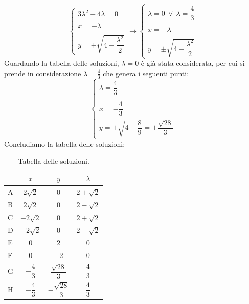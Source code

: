 \documentclass[a4paper]{article}
\begin{document}
	\begin{equation*}
		\begin{cases}
			3\lambda^{2} - 4\lambda = 0 \\
			\\
			x = -\lambda \\
			\\
			y = \pm \sqrt{4 - \dfrac{\lambda^{2}}{2}}
		\end{cases}
		\longrightarrow
		\begin{cases}
			\lambda = 0 \: \lor \: \lambda = \dfrac{4}{3}  \\
			\\
			x = -\lambda \\
			\\
			y = \pm \sqrt{4 - \dfrac{\lambda^{2}}{2}}
		\end{cases}
	\end{equation*}
	Guardando la tabella delle soluzioni, $\lambda = 0$ è già stata considerata, per cui si prende in considerazione $\lambda = \frac{4}{3}$ che genera i seguenti punti:
	\begin{equation*}
		\begin{cases}
			\lambda = \dfrac{4}{3} \\
			\\
			x = -\dfrac{4}{3} \\
			y = \pm \sqrt{4 - \dfrac{8}{9}} = \pm \dfrac{\sqrt{28}}{3}
		\end{cases}
	\end{equation*}
	Concludiamo la tabella delle soluzioni:
	\begin{table}[!htp]
		\centering
		\begin{tabular}{@{} l | c | c | c @{}}
			\toprule
			& $x$ & $y$ & $\lambda$ \\
			\midrule
			A & $2\sqrt{2}$ & $0$ & $2+\sqrt{2}$ \\
			B & $2\sqrt{2}$ & $0$ & $2-\sqrt{2}$ \\
			C & $-2\sqrt{2}$ & $0$ & $2+\sqrt{2}$ \\
			D & $-2\sqrt{2}$ & $0$ & $2-\sqrt{2}$ \\
			\cmidrule{1-4}
			E & $0$  & $2$ & $0$ \\
			F & $0$  & $-2$ & $0$ \\
			\cmidrule{1-4}
			G & $-\dfrac{4}{3}$ & $\dfrac{\sqrt{28}}{3}$ & $\dfrac{4}{3}$ \\ [1em]
			H & $-\dfrac{4}{3}$ & $-\dfrac{\sqrt{28}}{3}$ & $\dfrac{4}{3}$ \\
			\bottomrule
		\end{tabular}
		\caption*{Tabella delle soluzioni.}
	\end{table}
\end{document}
